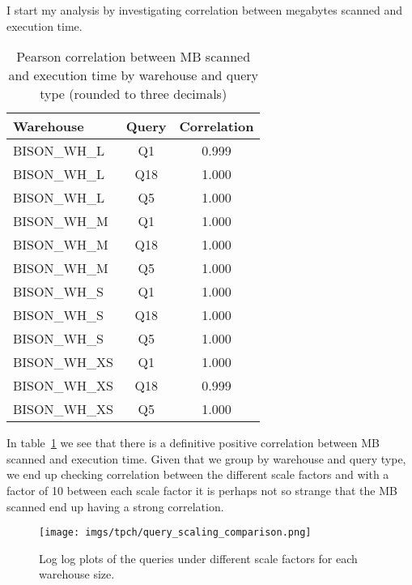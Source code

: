 \documentclass{article}
\begin{document}
I start my analysis by investigating correlation between megabytes scanned and execution time.

\begin{table}[htbp]
    \centering
    \begin{tabular}{lcc}
        \toprule
        \textbf{Warehouse} & \textbf{Query} & \textbf{Correlation} \\
        \midrule
        BISON\_WH\_L & Q1 & 0.999 \\
        BISON\_WH\_L & Q18 & 1.000 \\
        BISON\_WH\_L & Q5 & 1.000 \\
        \midrule
        BISON\_WH\_M & Q1 & 1.000 \\
        BISON\_WH\_M & Q18 & 1.000 \\
        BISON\_WH\_M & Q5 & 1.000 \\
        \midrule
        BISON\_WH\_S & Q1 & 1.000 \\
        BISON\_WH\_S & Q18 & 1.000 \\
        BISON\_WH\_S & Q5 & 1.000 \\
        \midrule
        BISON\_WH\_XS & Q1 & 1.000 \\
        BISON\_WH\_XS & Q18 & 0.999 \\
        BISON\_WH\_XS & Q5 & 1.000 \\
        \bottomrule
    \end{tabular}
    \caption{Pearson correlation between MB scanned and execution time by warehouse and query type (rounded to three decimals)}
    \label{tab:tpch_mbscanned_executiontime_correlations}
\end{table}

In table~\ref{tab:tpch_mbscanned_executiontime_correlations} we see that there is a definitive positive correlation between MB scanned and execution time. Given that we group by warehouse and query type, we end up checking correlation between the different scale factors and with a factor of 10 between each scale factor it is perhaps not so strange that the MB scanned end up having a strong correlation. 

\medskip \noindent 

\begin{figure}[htbp]
    \centering
    \texttt{[image: imgs/tpch/query\_scaling\_comparison.png]}
    \caption{Log log plots of the queries under different scale factors for each warehouse size. }
    \label{fig:query_scaling_comp}
\end{figure}
\end{document}
